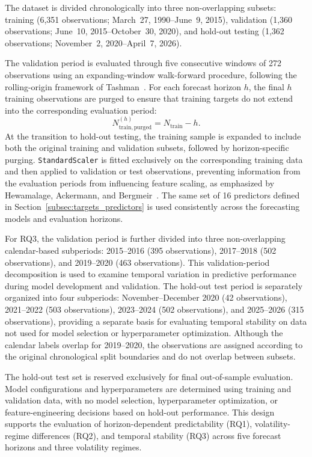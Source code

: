 \documentclass[runningheads,orivec]{llncs}
\begin{document}
The dataset is divided chronologically into three non-overlapping subsets: training (6,351 observations; March~27, 1990--June~9, 2015), validation (1,360 observations; June~10, 2015--October~30, 2020), and hold-out testing (1,362 observations; November~2, 2020--April~7, 2026).

The validation period is evaluated through five consecutive windows of 272 observations using an expanding-window walk-forward procedure, following the rolling-origin framework of Tashman~\cite{tashman2000}. For each forecast horizon $h$, the final $h$ training observations are purged to ensure that training targets do not extend into the corresponding evaluation period:
\begin{equation}\label{eq:train_purged}
N_{\mathrm{train,purged}}^{(h)} = N_{\mathrm{train}} - h.
\end{equation}
At the transition to hold-out testing, the training sample is expanded to include both the original training and validation subsets, followed by horizon-specific purging. \texttt{StandardScaler} is fitted exclusively on the corresponding training data and then applied to validation or test observations, preventing information from the evaluation periods from influencing feature scaling, as emphasized by Hewamalage, Ackermann, and Bergmeir~\cite{hewamalage2023}. The same set of 16 predictors defined in Section~\ref{subsec:targets_predictors} is used consistently across the forecasting models and evaluation horizons.

For RQ3, the validation period is further divided into three non-overlapping calendar-based subperiods: 2015--2016 (395 observations), 2017--2018 (502 observations), and 2019--2020 (463 observations). This validation-period decomposition is used to examine temporal variation in predictive performance during model development and validation. The hold-out test period is separately organized into four subperiods: November--December 2020 (42 observations), 2021--2022 (503 observations), 2023--2024 (502 observations), and 2025--2026 (315 observations), providing a separate basis for evaluating temporal stability on data not used for model selection or hyperparameter optimization. Although the calendar labels overlap for 2019--2020, the observations are assigned according to the original chronological split boundaries and do not overlap between subsets.

The hold-out test set is reserved exclusively for final out-of-sample evaluation. Model configurations and hyperparameters are determined using training and validation data, with no model selection, hyperparameter optimization, or feature-engineering decisions based on hold-out performance. This design supports the evaluation of horizon-dependent predictability (RQ1), volatility-regime differences (RQ2), and temporal stability (RQ3) across five forecast horizons and three volatility regimes.
\end{document}

